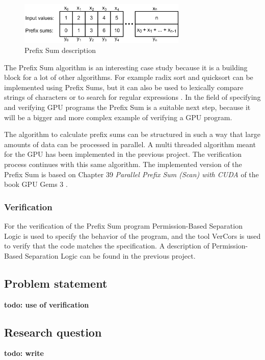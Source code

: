 \documentclass[a4paper]{article}
\newcommand{\todo}[1]{{\color{BurntOrange}\sffamily\textbf{todo: #1}\par}}
\begin{document}
\begin{figure}[htb!]
	\centering
	\includegraphics[width=80mm]{../images/prefix-sum-v1.png}
	\caption{Prefix Sum description}
	\label{prefixsumexample}
\end{figure}

The Prefix Sum algorithm is an interesting case study because it is a building block for a lot of other algorithms. For example radix sort and quicksort can be implemented using Prefix Sums, but it can also be used to lexically compare strings of characters or to search for regular expressions \cite{Blelloch:PrefixSumApplications}. In the field of specifying and verifying GPU programs the Prefix Sum is a suitable next step, because it will be a bigger and more complex example of verifying a GPU program.

The algorithm to calculate prefix sums can be structured in such a way that large amounts of data can be processed in parallel. A multi threaded algorithm meant for the GPU has been implemented in the previous project. The verification process continues with this same algorithm. The implemented version of the Prefix Sum is based on Chapter 39 \emph{Parallel Prefix Sum (Scan) with CUDA} of the book GPU Gems 3 \cite{Nguyen:GPUGems3}.

\subsubsection{Verification}
For the verification of the Prefix Sum program Permission-Based Separation Logic is used to specify the behavior of the program, and the tool VerCors is used to verify that the code matches the specification. A description of Permission-Based Separation Logic can be found in the previous project\cite{bachelorThesis}. 

\subsection{Problem statement}
\todo{use of verification}

\subsection{Research question}
\todo{write}
\end{document}

